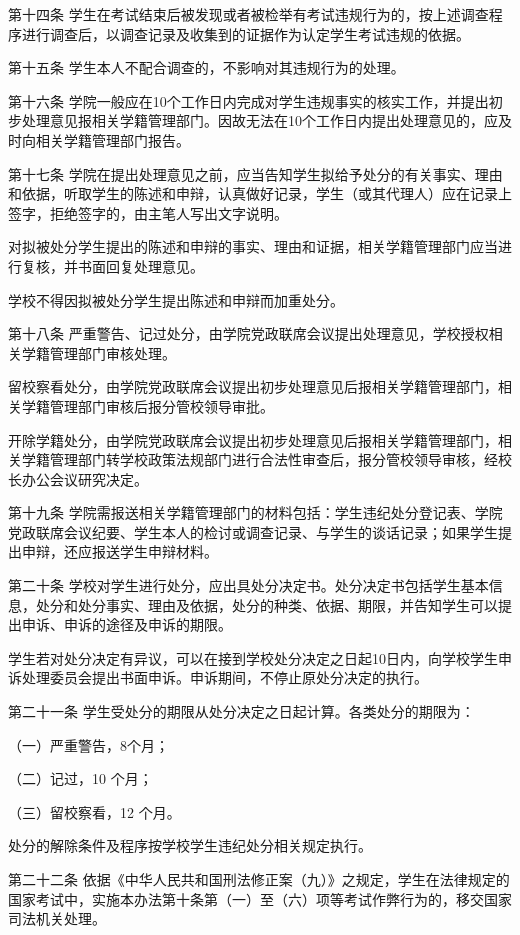 \documentclass[UTF8,12pt,a4paper]{report}
\begin{document}
第十四条  学生在考试结束后被发现或者被检举有考试违规行为的，按上述调查程序进行调查后，以调查记录及收集到的证据作为认定学生考试违规的依据。

第十五条  学生本人不配合调查的，不影响对其违规行为的处理。

第十六条  学院一般应在10个工作日内完成对学生违规事实的核实工作，并提出初步处理意见报相关学籍管理部门。因故无法在10个工作日内提出处理意见的，应及时向相关学籍管理部门报告。

第十七条  学院在提出处理意见之前，应当告知学生拟给予处分的有关事实、理由和依据，听取学生的陈述和申辩，认真做好记录，学生（或其代理人）应在记录上签字，拒绝签字的，由主笔人写出文字说明。

对拟被处分学生提出的陈述和申辩的事实、理由和证据，相关学籍管理部门应当进行复核，并书面回复处理意见。

学校不得因拟被处分学生提出陈述和申辩而加重处分。

第十八条  严重警告、记过处分，由学院党政联席会议提出处理意见，学校授权相关学籍管理部门审核处理。

留校察看处分，由学院党政联席会议提出初步处理意见后报相关学籍管理部门，相关学籍管理部门审核后报分管校领导审批。

开除学籍处分，由学院党政联席会议提出初步处理意见后报相关学籍管理部门，相关学籍管理部门转学校政策法规部门进行合法性审查后，报分管校领导审核，经校长办公会议研究决定。

第十九条  学院需报送相关学籍管理部门的材料包括：学生违纪处分登记表、学院党政联席会议纪要、学生本人的检讨或调查记录、与学生的谈话记录；如果学生提出申辩，还应报送学生申辩材料。

第二十条  学校对学生进行处分，应出具处分决定书。处分决定书包括学生基本信息，处分和处分事实、理由及依据，处分的种类、依据、期限，并告知学生可以提出申诉、申诉的途径及申诉的期限。

学生若对处分决定有异议，可以在接到学校处分决定之日起10日内，向学校学生申诉处理委员会提出书面申诉。申诉期间，不停止原处分决定的执行。

第二十一条  学生受处分的期限从处分决定之日起计算。各类处分的期限为：

（一）严重警告，8个月；

（二）记过，10 个月；

（三）留校察看，12 个月。

处分的解除条件及程序按学校学生违纪处分相关规定执行。

第二十二条  依据《中华人民共和国刑法修正案（九）》之规定，学生在法律规定的国家考试中，实施本办法第十条第（一）至（六）项等考试作弊行为的，移交国家司法机关处理。
\end{document}
